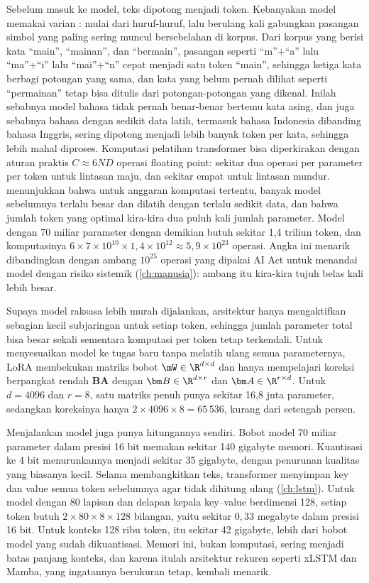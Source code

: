 Sebelum masuk ke model, teks dipotong menjadi token. Kebanyakan model memakai varian 
\citep{sennrich2016}: mulai dari huruf-huruf, lalu berulang kali gabungkan pasangan simbol yang paling sering muncul
bersebelahan di korpus. Dari korpus yang berisi kata ``main'', ``mainan'', dan ``bermain'', pasangan seperti
``m''+``a'' lalu ``ma''+``i'' lalu ``mai''+``n'' cepat menjadi satu token ``main'', sehingga ketiga kata berbagi potongan
yang sama, dan kata yang belum pernah dilihat seperti ``permainan'' tetap bisa ditulis dari potongan-potongan yang
dikenal. Inilah sebabnya model bahasa tidak pernah benar-benar bertemu kata asing, dan juga sebabnya bahasa dengan
sedikit data latih, termasuk bahasa Indonesia dibanding bahasa Inggris, sering dipotong menjadi lebih banyak token
per kata, sehingga lebih mahal diproses. Komputasi pelatihan transformer bisa diperkirakan dengan aturan praktis
$C\approx6ND$ operasi floating point: sekitar dua operasi per parameter per token untuk lintasan maju,
dan sekitar empat untuk lintasan mundur. \citet{hoffmann2022} menunjukkan bahwa untuk anggaran komputasi
tertentu, banyak model sebelumnya terlalu besar dan dilatih dengan terlalu sedikit data, dan bahwa
jumlah token yang optimal kira-kira dua puluh kali jumlah parameter. Model dengan 70 miliar parameter
dengan demikian butuh sekitar 1,4 triliun token, dan komputasinya $6\times7\times10^{10}\times1{,}4\times10^{12}
\approx5{,}9\times10^{23}$ operasi. Angka ini menarik dibandingkan dengan ambang $10^{25}$ operasi yang dipakai
AI Act untuk menandai model dengan risiko sistemik (\cref{ch:manusia}): ambang itu kira-kira tujuh belas
kali lebih besar.

Supaya model raksasa lebih murah dijalankan, arsitektur  \citep{fedus2022}
hanya mengaktifkan sebagian kecil subjaringan untuk setiap token, sehingga jumlah parameter total bisa
besar sekali sementara komputasi per token tetap terkendali. Untuk menyesuaikan model ke tugas baru tanpa
melatih ulang semua parameternya, LoRA \citep{hu2022} membekukan matriks bobot $\mW\in\R^{d\times d}$ dan
hanya mempelajari koreksi berpangkat rendah $\bm B\bm A$ dengan $\bm B\in\R^{d\times r}$ dan
$\bm A\in\R^{r\times d}$. Untuk $d=4096$ dan $r=8$, satu matriks penuh punya sekitar 16,8 juta parameter,
sedangkan koreksinya hanya $2\times4096\times8=65\,536$, kurang dari setengah persen.

Menjalankan model juga punya hitungannya sendiri. Bobot model 70 miliar parameter dalam presisi 16 bit memakan
sekitar 140 gigabyte memori. Kuantisasi ke 4 bit menurunkannya menjadi sekitar 35 gigabyte, dengan penurunan kualitas
yang biasanya kecil. Selama membangkitkan teks, transformer menyimpan key dan value semua token sebelumnya agar tidak
dihitung ulang (\cref{ch:lstm}). Untuk model dengan 80 lapisan dan delapan kepala key--value berdimensi 128, setiap
token butuh $2\times80\times8\times128$ bilangan, yaitu sekitar $0{,}33$ megabyte dalam presisi 16 bit. Untuk konteks
128 ribu token, itu sekitar 42 gigabyte, lebih dari bobot model yang sudah dikuantisasi. Memori ini, bukan komputasi,
sering menjadi batas panjang konteks, dan karena itulah arsitektur rekuren seperti xLSTM dan Mamba, yang ingatannya
berukuran tetap, kembali menarik.


